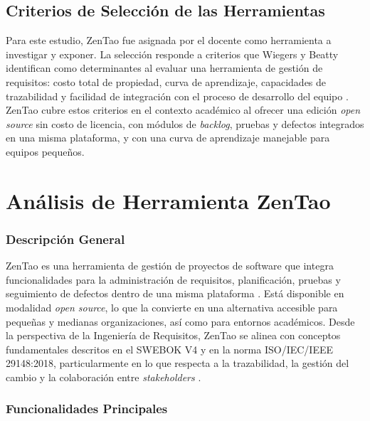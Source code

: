 \documentclass[journal,onecolumn]{IEEEtran}
\begin{document}
\subsection{Criterios de Selección de las Herramientas}

Para este estudio, ZenTao fue asignada por el docente como herramienta a investigar y exponer.
La selección responde a criterios que Wiegers y Beatty identifican como determinantes al evaluar
una herramienta de gestión de requisitos: costo total de propiedad, curva de aprendizaje,
capacidades de trazabilidad y facilidad de integración con el proceso de desarrollo del equipo
\cite{wiegers2013}. ZenTao cubre estos criterios en el contexto académico al ofrecer una edición
\textit{open source} sin costo de licencia, con módulos de \textit{backlog}, pruebas y defectos
integrados en una misma plataforma, y con una curva de aprendizaje manejable para equipos pequeños.
\newpage

\section{Análisis de Herramienta ZenTao}

\subsubsection{Descripción General}

ZenTao es una herramienta de gestión de proyectos de software que integra funcionalidades para
la administración de requisitos, planificación, pruebas y seguimiento de defectos dentro de una
misma plataforma \cite{zentao2025}. Está disponible en modalidad \textit{open source}, lo que la
convierte en una alternativa accesible para pequeñas y medianas organizaciones, así como para
entornos académicos. Desde la perspectiva de la Ingeniería de Requisitos, ZenTao se alinea con
conceptos fundamentales descritos en el SWEBOK V4 y en la norma ISO/IEC/IEEE 29148:2018,
particularmente en lo que respecta a la trazabilidad, la gestión del cambio y la colaboración
entre \textit{stakeholders} \cite{iso29148}.

\subsubsection{Funcionalidades Principales}
\end{document}
